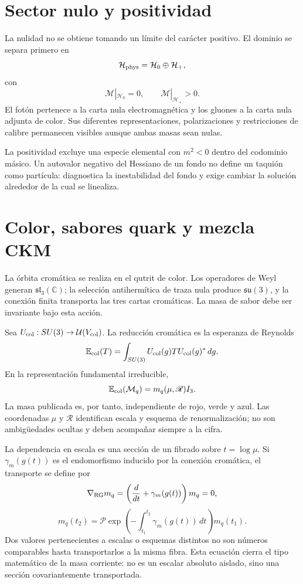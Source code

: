 \section{Sector nulo y positividad}

La nulidad no se obtiene tomando un límite del carácter positivo. El dominio
se separa primero en
\[
 \mathcal H_{\rm phys}=\mathcal H_0\oplus\mathcal H_+,
\]
con
\[
 \mathcal M|_{\mathcal H_0}=0,
 \qquad
 \mathcal M|_{\mathcal H_+}>0.
\]
El fotón pertenece a la carta nula electromagnética y los gluones a la carta
nula adjunta de color. Sus diferentes representaciones, polarizaciones y
restricciones de calibre permanecen visibles aunque ambas masas sean nulas.

La positividad excluye una especie elemental con \(m^2<0\) dentro del
codominio másico. Un autovalor negativo del Hessiano de un fondo no define un
taquión como partícula: diagnostica la inestabilidad del fondo y exige cambiar
la solución alrededor de la cual se linealiza.

\section{Color, sabores quark y mezcla CKM}

La órbita cromática se realiza en el qutrit de color. Los operadores de Weyl
generan \(\mathfrak{sl}_3(\mathbb C)\); la selección antihermítica de traza
nula produce \(\mathfrak{su}(3)\), y la conexión finita transporta las tres
cartas cromáticas. La masa de sabor debe ser invariante bajo esta acción.

Sea \(U_{\rm col}:SU(3)\to\mathcal U(V_{\rm col})\). La reducción cromática
es la esperanza de Reynolds
\[
 \mathbb E_{\rm col}(T)
 =\int_{SU(3)}U_{\rm col}(g)T U_{\rm col}(g)^*\,dg.
\]
En la representación fundamental irreducible,
\[
 \mathbb E_{\rm col}(\mathcal M_q)
 =m_q(\mu,\mathscr R)I_3.
\]
La masa publicada es, por tanto, independiente de rojo, verde y azul. Las
coordenadas \(\mu\) y \(\mathscr R\) identifican escala y esquema de
renormalización; no son ambigüedades ocultas y deben acompañar siempre a la
cifra.

La dependencia en escala es una sección de un fibrado sobre
\(t=\log\mu\). Si \(\gamma_m(g(t))\) es el endomorfismo inducido por la
conexión cromática, el transporte se define por
\[
 \nabla_{\rm RG}m_q
 =\left(\frac{d}{dt}+\gamma_m(g(t))\right)m_q=0,
\]
\[
 m_q(t_2)
 =\mathcal P\exp\!\left(-\int_{t_1}^{t_2}
 \gamma_m(g(t))\,dt\right)m_q(t_1).
\]
Dos valores pertenecientes a escalas o esquemas distintos no son números
comparables hasta transportarlos a la misma fibra. Esta ecuación cierra el
tipo matemático de la masa corriente: no es un escalar absoluto aislado, sino
una sección covariantemente transportada.

